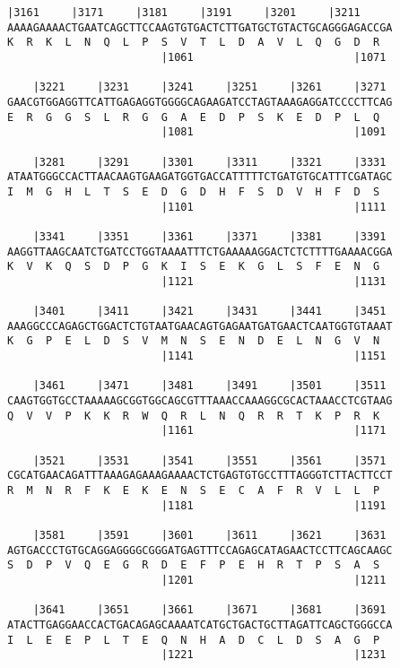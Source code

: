 \documentclass{article}
\begin{document}
\newpage
\begin{Verbatim}[fontfamily=courier]
    |3161     |3171     |3181     |3191     |3201     |3211 
AAAAGAAAACTGAATCAGCTTCCAAGTGTGACTCTTGATGCTGTACTGCAGGGAGACCGA
K  R  K  L  N  Q  L  P  S  V  T  L  D  A  V  L  Q  G  D  R  
                        |1061                         |1071 

    |3221     |3231     |3241     |3251     |3261     |3271 
GAACGTGGAGGTTCATTGAGAGGTGGGGCAGAAGATCCTAGTAAAGAGGATCCCCTTCAG
E  R  G  G  S  L  R  G  G  A  E  D  P  S  K  E  D  P  L  Q  
                        |1081                         |1091 

    |3281     |3291     |3301     |3311     |3321     |3331 
ATAATGGGCCACTTAACAAGTGAAGATGGTGACCATTTTTCTGATGTGCATTTCGATAGC
I  M  G  H  L  T  S  E  D  G  D  H  F  S  D  V  H  F  D  S  
                        |1101                         |1111 

    |3341     |3351     |3361     |3371     |3381     |3391 
AAGGTTAAGCAATCTGATCCTGGTAAAATTTCTGAAAAAGGACTCTCTTTTGAAAACGGA
K  V  K  Q  S  D  P  G  K  I  S  E  K  G  L  S  F  E  N  G  
                        |1121                         |1131 

    |3401     |3411     |3421     |3431     |3441     |3451 
AAAGGCCCAGAGCTGGACTCTGTAATGAACAGTGAGAATGATGAACTCAATGGTGTAAAT
K  G  P  E  L  D  S  V  M  N  S  E  N  D  E  L  N  G  V  N  
                        |1141                         |1151 

    |3461     |3471     |3481     |3491     |3501     |3511 
CAAGTGGTGCCTAAAAAGCGGTGGCAGCGTTTAAACCAAAGGCGCACTAAACCTCGTAAG
Q  V  V  P  K  K  R  W  Q  R  L  N  Q  R  R  T  K  P  R  K  
                        |1161                         |1171 

    |3521     |3531     |3541     |3551     |3561     |3571 
CGCATGAACAGATTTAAAGAGAAAGAAAACTCTGAGTGTGCCTTTAGGGTCTTACTTCCT
R  M  N  R  F  K  E  K  E  N  S  E  C  A  F  R  V  L  L  P  
                        |1181                         |1191 

    |3581     |3591     |3601     |3611     |3621     |3631 
AGTGACCCTGTGCAGGAGGGGCGGGATGAGTTTCCAGAGCATAGAACTCCTTCAGCAAGC
S  D  P  V  Q  E  G  R  D  E  F  P  E  H  R  T  P  S  A  S  
                        |1201                         |1211 

    |3641     |3651     |3661     |3671     |3681     |3691 
ATACTTGAGGAACCACTGACAGAGCAAAATCATGCTGACTGCTTAGATTCAGCTGGGCCA
I  L  E  E  P  L  T  E  Q  N  H  A  D  C  L  D  S  A  G  P  
                        |1221                         |1231 

\end{Verbatim}
\end{document}
